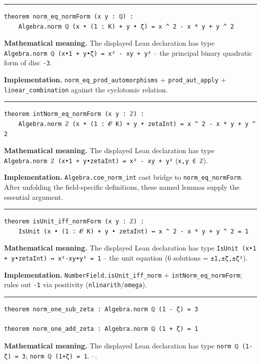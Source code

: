 \documentclass[UTF8,a4paper,11pt,fontset=fandol]{ctexart}
\theoremstyle{definition}
\newcommand{\statementsep}{\par\medskip\hrule\medskip}
\begin{document}
\statementsep
\begin{verbatim}
theorem norm_eq_normForm (x y : ℚ) :
    Algebra.norm ℚ (x • (1 : K) + y • ζ) = x ^ 2 - x * y + y ^ 2
\end{verbatim}
\noindent\textbf{Mathematical meaning.} The displayed Lean declaration has type \texttt{Algebra.\allowbreak{}norm ℚ (x•1 + y•ζ) = x² - xy + y²} -- the principal binary quadratic form of disc \texttt{-3}.\par
\noindent\textbf{Implementation.} \texttt{norm\_\allowbreak{}eq\_\allowbreak{}prod\_\allowbreak{}automorphisms} + \texttt{prod\_\allowbreak{}aut\_\allowbreak{}apply} + \texttt{linear\_\allowbreak{}combination} against the cyclotomic relation.\par
\statementsep
\begin{verbatim}
theorem intNorm_eq_normForm (x y : ℤ) :
    Algebra.norm ℤ (x • (1 : 𝓞 K) + y • zetaInt) = x ^ 2 - x * y + y ^ 2
\end{verbatim}
\noindent\textbf{Mathematical meaning.} The displayed Lean declaration has type \texttt{Algebra.\allowbreak{}norm ℤ (x•1 + y•zetaInt) = x² - xy + y²} (\texttt{x,y ∈ ℤ}).\par
\noindent\textbf{Implementation.} \texttt{Algebra.\allowbreak{}coe\_\allowbreak{}norm\_\allowbreak{}int} cast bridge to \texttt{norm\_\allowbreak{}eq\_\allowbreak{}normForm}. After unfolding the field-specific definitions, these named lemmas supply the essential argument.\par
\statementsep
\begin{verbatim}
theorem isUnit_iff_normForm (x y : ℤ) :
    IsUnit (x • (1 : 𝓞 K) + y • zetaInt) ↔ x ^ 2 - x * y + y ^ 2 = 1
\end{verbatim}
\noindent\textbf{Mathematical meaning.} The displayed Lean declaration has type \texttt{IsUnit (x•1 + y•zetaInt) ↔ x²-xy+y² = 1} -- the unit equation (6 solutions = \texttt{±1,±ζ,±ζ²}).\par
\noindent\textbf{Implementation.} \texttt{NumberField.\allowbreak{}isUnit\_\allowbreak{}iff\_\allowbreak{}norm} + \texttt{intNorm\_\allowbreak{}eq\_\allowbreak{}normForm}; rules out \texttt{-1} via positivity (\texttt{nlinarith}/\texttt{omega}).\par
\statementsep
\begin{verbatim}
theorem norm_one_sub_zeta : Algebra.norm ℚ (1 - ζ) = 3

theorem norm_one_add_zeta : Algebra.norm ℚ (1 + ζ) = 1
\end{verbatim}
\noindent\textbf{Mathematical meaning.} The displayed Lean declaration has type \texttt{norm ℚ (1-ζ) = 3}; \texttt{norm ℚ (1+ζ) = 1}. --.\par
\end{document}
